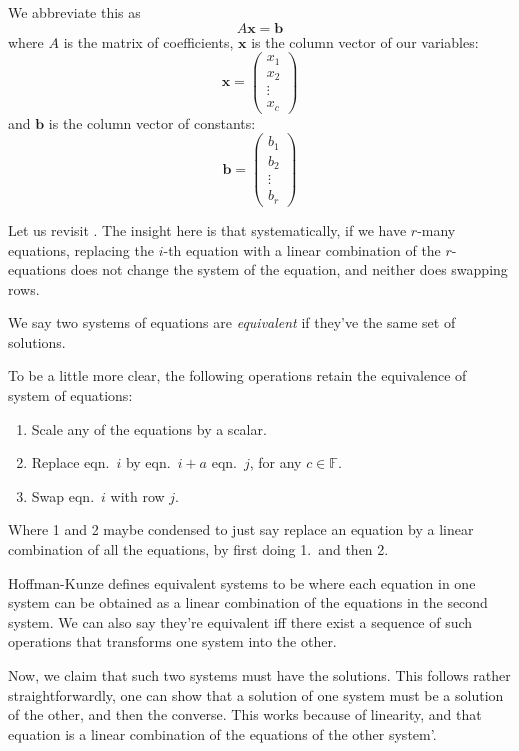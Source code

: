 We abbreviate this as
\begin{equation}
	A \mathbf{x} = \mathbf{b}
\end{equation}
where $A$ is the matrix of coefficients, $\mathbf{x}$ is the column vector of our variables:
\[
\mathbf{x} = \begin{pmatrix}
    x_1 \\
    x_2 \\
    \vdots \\
    x_c
\end{pmatrix}
\]
and $\mathbf{b}$ is the column vector of constants:
\[
\mathbf{b} = \begin{pmatrix}
    b_1 \\
    b_2 \\
    \vdots \\
    b_r
\end{pmatrix}
\]

Let us revisit . The insight here is that systematically, if we have $r$-many
equations, replacing the $i$-th equation with a linear combination of the $r$-equations
does not change the system of the equation, and neither does swapping rows.


\begin{definition}
We say two systems of equations are \emph{equivalent} if they've the same set of solutions.
\end{definition}

To be a little more clear, the following operations retain the equivalence of system of equations:
\begin{enumerate}
    \item Scale any of the equations by a scalar.
    \item Replace eqn.\ $i$ by eqn.\ $i + a$ eqn.\ $j$, for any $c \in \mathbb{F}$.
    \item Swap eqn.\ $i$ with row $j$.
\end{enumerate}

Where 1 and 2 maybe condensed to just say replace an equation by a linear combination of all the equations, by first doing 1.\ and then 2.

\begin{remark}
Hoffman-Kunze defines equivalent systems to be where each equation
in one system can be obtained as a linear combination of the equations in the second system.
We can also say they're equivalent iff there exist a sequence of such operations that transforms one system into the other.

Now, we claim that such two systems must have the solutions.
This follows rather straightforwardly, one can show that a solution of one system must be a
solution of the other, and then the converse. This works because of linearity,
and that equation is a linear combination of the equations of the other system'.
\end{remark}

